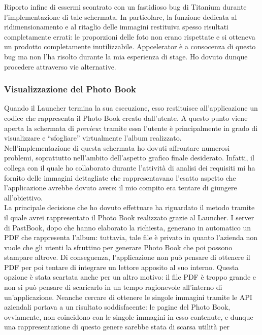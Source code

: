 				\noindent Riporto infine di essermi scontrato con un fastidioso bug di Titanium durante l'implementazione di tale
				schermata. In particolare, la funzione dedicata al ridimensionamento e al ritaglio delle immagini restituiva spesso
				risultati completamente errati: le proporzioni delle foto non erano rispettate e si otteneva un prodotto
				completamente inutilizzabile. Appcelerator è a consocenza di questo bug ma non l'ha risolto durante la mia
				esperienza di stage. Ho dovuto dunque procedere attraverso vie alternative.
			\subsubsection{Visualizzazione del Photo Book}
				Quando il Launcher termina la sua esecuzione, esso restituisce all'applicazione un codice che rappresenta il Photo
				Book creato dall'utente. A questo punto viene aperta la schermata di \emph{preview}: tramite essa l'utente è 
				principalmente in grado di visualizzare e “sfogliare” virtualmente l'album realizzato.\\
				Nell'implementazione di questa schermata ho dovuti affrontare numerosi problemi, soprattutto nell'ambito dell'aspetto
				grafico finale desiderato. Infatti, il collega con il quale ho collaborato durante l'attività di analisi dei
				requisiti mi ha fornito delle immagini dettagliate che rappresentavano l'esatto aspetto che l'applicazione avrebbe
				dovuto avere: il mio compito era tentare di giungere all'obiettivo.\\
				La principale decisione che ho dovuto effettuare ha riguardato il metodo tramite il quale avrei rappresentato il
				Photo Book realizzato grazie al Launcher. I server di PastBook, dopo che hanno elaborato la richiesta, generano in
				automatico un PDF che rappresenta l'album: tuttavia, tale file è privato in quanto l'azienda non vuole che gli utenti
				la sfruttino per generare Photo Book che poi possono stampare altrove. Di conseguenza, l'applicazione
				non può pensare di ottenere il PDF per poi tentare di integrare un lettore apposito al suo interno. Questa opzione
				è stata scartata anche per un altro motivo: il file PDF è troppo grande e non si può pensare di scaricarlo in un
				tempo ragionevole all'interno di un'applicazione. Neanche cercare di ottenere le singole immagini tramite le API
				aziendali portava a un risultato soddisfacente: le pagine del Photo Book, ovviamente, non coincidono con le singole
				immagini in esso contenute, e dunque una rappresentazione di questo genere sarebbe stata di scarsa utilità per
